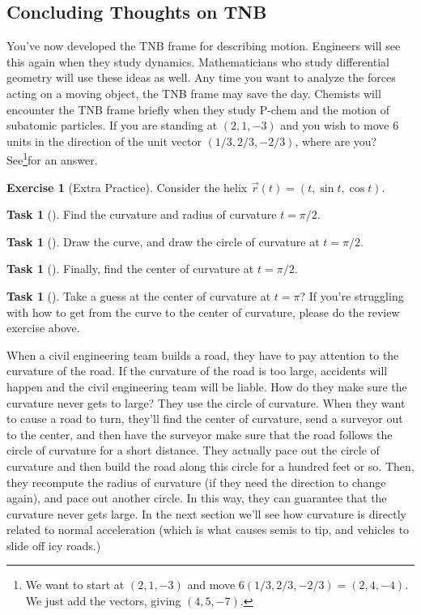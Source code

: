 \documentclass[10pt,]{book}
\theoremstyle{plain}
\theoremstyle{definition}
\theoremstyle{definition}
\theoremstyle{definition}
\theoremstyle{definition}
\newtheorem{exploration}[project]{Exercise}
\newtheorem{task}[project]{Task}
\theoremstyle{definition}
\numberwithin{equation}{section}
\begin{document}
\subsection[{Concluding Thoughts on TNB}]{Concluding Thoughts on TNB}\label{subsection-26}
You've now developed the TNB frame for describing motion. Engineers will see this again when they study dynamics. Mathematicians who study differential geometry will use these ideas as well. Any time you want to analyze the forces acting on a moving object, the TNB frame may save the day. Chemists will encounter the TNB frame briefly when they study P-chem and the motion of subatomic particles.%
If you are standing at \((2,1,-3)\) and you wish to move 6 units in the direction of the unit vector \((1/3, 2/3, -2/3)\), where are you? See\footnote{We want to start at \((2,1,-3)\) and move \(6(1/3, 2/3, -2/3) = (2,4,-4)\). We just add the vectors, giving \((4,5,-7)\).\label{fn-14}}for an answer.%
\begin{exploration}[Extra Practice]\label{exploration-180}
Consider the helix \(\vec r(t)=(t,\sin t,\cos t)\).%
\begin{task}[]\label{task-442}
Find the curvature and radius of curvature \(t=\pi/2\).%
\end{task}
\begin{task}[]\label{task-443}
Draw the curve, and draw the circle of curvature at \(t=\pi/2\).%
\end{task}
\begin{task}[]\label{task-444}
Finally, find the center of curvature at \(t=\pi/2\).%
\end{task}
\begin{task}[]\label{task-445}
Take a guess at the center of curvature at \(t=\pi\)? If you're struggling with how to get from the curve to the center of curvature, please do the review exercise above.%
%
\end{task}
\end{exploration}
When a civil engineering team builds a road, they have to pay attention to the curvature of the road. If the curvature of the road is too large, accidents will happen and the civil engineering team will be liable. How do they make sure the curvature never gets to large? They use the circle of curvature. When they want to cause a road to turn, they'll find the center of curvature, send a surveyor out to the center, and then have the surveyor make sure that the road follows the circle of curvature for a short distance. They actually pace out the circle of curvature and then build the road along this circle for a hundred feet or so. Then, they recompute the radius of curvature (if they need the direction to change again), and pace out another circle. In this way, they can guarantee that the curvature never gets large. In the next section we'll see how curvature is directly related to normal acceleration (which is what causes semis to tip, and vehicles to slide off icy roads.)%
\typeout{************************************************}
\typeout{************************************************}
\end{document}
